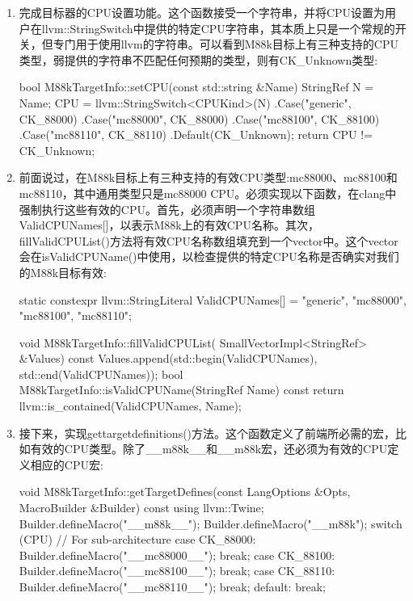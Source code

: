 \begin{enumerate}
\begin{cpp}
    IntMaxType = SignedLongLong;
    Int64Type = SignedLongLong;
    SizeType = UnsignedLong;
    PtrDiffType = SignedInt;
    IntPtrType = SignedInt;
}
\end{cpp}

\item
完成目标器的CPU设置功能。这个函数接受一个字符串，并将CPU设置为用户在llvm::StringSwitch中提供的特定CPU字符串，其本质上只是一个常规的开关，但专门用于使用llvm的字符串。可以看到M88k目标上有三种支持的CPU类型，弱提供的字符串不匹配任何预期的类型，则有CK\_Unknown类型:

\begin{cpp}
bool M88kTargetInfo::setCPU(const std::string &Name) {
    StringRef N = Name;
    CPU = llvm::StringSwitch<CPUKind>(N)
                .Case("generic", CK_88000)
                .Case("mc88000", CK_88000)
                .Case("mc88100", CK_88100)
                .Case("mc88110", CK_88110)
                .Default(CK_Unknown);
    return CPU != CK_Unknown;
}
\end{cpp}

\item
前面说过，在M88k目标上有三种支持的有效CPU类型:mc88000、mc88100和mc88110，其中通用类型只是mc88000 CPU。必须实现以下函数，在clang中强制执行这些有效的CPU。首先，必须声明一个字符串数组ValidCPUNames[]，以表示M88k上的有效CPU名称。其次，fillValidCPUList()方法将有效CPU名称数组填充到一个vector中。这个vector会在isValidCPUName()中使用，以检查提供的特定CPU名称是否确实对我们的M88k目标有效:

\begin{cpp}
static constexpr llvm::StringLiteral ValidCPUNames[] = {
    {"generic"}, {"mc88000"}, {"mc88100"}, {"mc88110"}};

void M88kTargetInfo::fillValidCPUList(
        SmallVectorImpl<StringRef> &Values) const {
    Values.append(std::begin(ValidCPUNames),
    std::end(ValidCPUNames));
}
bool M88kTargetInfo::isValidCPUName(StringRef Name) const {
    return llvm::is_contained(ValidCPUNames, Name);
}
\end{cpp}

\item
接下来，实现gettargetdefinitions()方法。这个函数定义了前端所必需的宏，比如有效的CPU类型。除了\_\_m88k\_\_和\_\_m88k宏，还必须为有效的CPU定义相应的CPU宏:

\begin{cpp}
void M88kTargetInfo::getTargetDefines(const LangOptions &Opts,
                                      MacroBuilder &Builder)
const {
    using llvm::Twine;
    Builder.defineMacro("__m88k__");
    Builder.defineMacro("__m88k");
    switch (CPU) { // For sub-architecture
    case CK_88000:
        Builder.defineMacro("__mc88000__");
        break;
    case CK_88100:
    Builder.defineMacro("__mc88100__");
    break;
    case CK_88110:
        Builder.defineMacro("__mc88110__");
        break;
    default:
        break;
    }
}
\end{cpp}


\end{enumerate}
